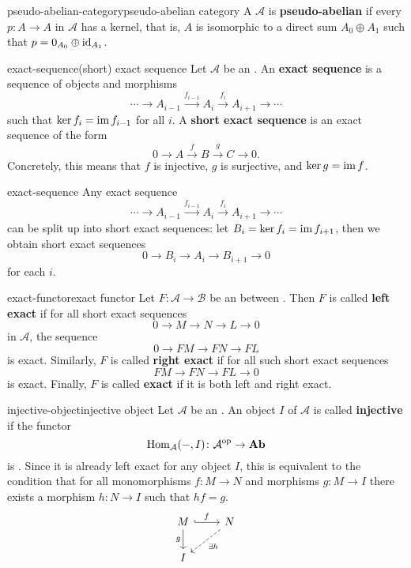 \begin{topic}{pseudo-abelian-category}{pseudo-abelian category}
    A  $\mathcal{A}$ is \textbf{pseudo-abelian} if every  $p \colon A \to A$ in $\mathcal{A}$ has a kernel, that is, $A$ is isomorphic to a direct sum $A_0 \oplus A_1$ such that $p = 0_{A_0} \oplus \textup{id}_{A_1}$.
\end{topic}

\begin{topic}{exact-sequence}{(short) exact sequence}
    Let $\mathcal{A}$ be an . An \textbf{exact sequence} is a sequence of objects and morphisms
    \[ \cdots \rightarrow A_{i - 1} \xrightarrow{f_{i - 1}} A_i \xrightarrow{f_i} A_{i + 1} \rightarrow \cdots \]
    such that $\ker f_i = \operatorname{im} f_{i - 1}$ for all $i$.
    A \textbf{short exact sequence} is an exact sequence of the form
    \[ 0 \to A \xrightarrow{f} B \xrightarrow{g} C \to 0 . \]
    Concretely, this means that $f$ is injective, $g$ is surjective, and $\ker g = \operatorname{im} f$.
\end{topic}

\begin{example}{exact-sequence}
    Any exact sequence
    \[ \cdots \rightarrow A_{i - 1} \xrightarrow{f_{i - 1}} A_i \xrightarrow{f_i} A_{i + 1} \rightarrow \cdots \]
    can be split up into short exact sequences: let $B_i = \ker f_i = \operatorname{im} f_{i + 1}$, then we obtain short exact sequences
    \[ 0 \to B_i \to A_i \to B_{i + 1} \to 0 \]
    for each $i$.
\end{example}

\begin{topic}{exact-functor}{exact functor}
    Let $F \colon \mathcal{A} \to \mathcal{B}$ be an  between . Then $F$ is called \textbf{left exact} if for all short exact sequences
    \[ 0 \to M \to N \to L \to 0 \]
     in $\mathcal{A}$, the sequence
    \[ 0 \to FM \to FN \to FL \]
    is exact. Similarly, $F$ is called \textbf{right exact} if for all such short exact sequences
    \[ FM \to FN \to FL \to 0 \]
    is exact. Finally, $F$ is called \textbf{exact} if it is both left and right exact.
\end{topic}

\begin{topic}{injective-object}{injective object}
    Let $\mathcal{A}$ be an . An object $I$ of $\mathcal{A}$ is called \textbf{injective} if the functor
    \[ \operatorname{Hom}_\mathcal{A}(-, I) \colon \mathcal{A}^\textup{op} \to \textbf{Ab} \]
    is . Since it is already left exact for any object $I$, this is equivalent to the condition that for all monomorphisms $f \colon M \to N$ and morphisms $g \colon M \to I$ there exists a morphism $h \colon N \to I$ such that $hf = g$.
    \[ \svg \begin{tikzcd} M \arrow[hookrightarrow]{r}{f} \arrow[swap]{d}{g} & N \arrow[dashed]{ld}{\exists h} \\ I & \end{tikzcd} \]
\end{topic}

